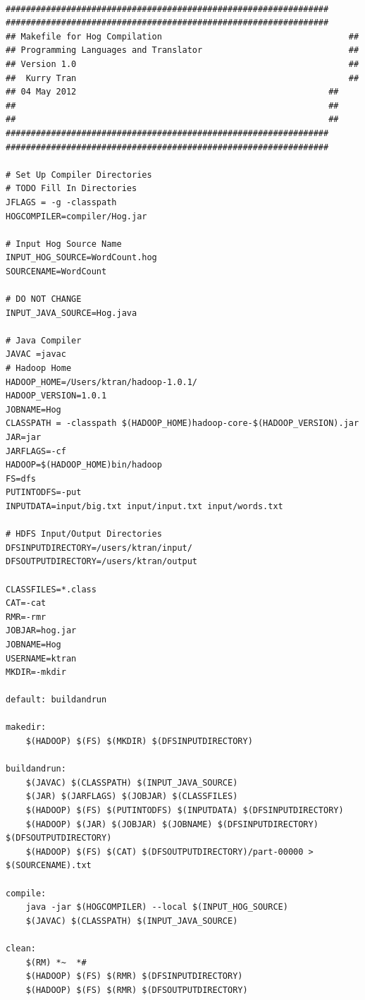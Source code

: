 \documentclass{report}
\begin{document}
\begin{itemize}
\begin{verbatim}

################################################################
################################################################
## Makefile for Hog Compilation										##
## Programming Languages and Translator								##
## Version 1.0														##
##  Kurry Tran														##
## 04 May 2012													##
##																##
##																##
################################################################
################################################################

# Set Up Compiler Directories
# TODO Fill In Directories
JFLAGS = -g -classpath
HOGCOMPILER=compiler/Hog.jar

# Input Hog Source Name
INPUT_HOG_SOURCE=WordCount.hog
SOURCENAME=WordCount

# DO NOT CHANGE
INPUT_JAVA_SOURCE=Hog.java

# Java Compiler
JAVAC =javac
# Hadoop Home
HADOOP_HOME=/Users/ktran/hadoop-1.0.1/
HADOOP_VERSION=1.0.1
JOBNAME=Hog
CLASSPATH = -classpath $(HADOOP_HOME)hadoop-core-$(HADOOP_VERSION).jar
JAR=jar
JARFLAGS=-cf
HADOOP=$(HADOOP_HOME)bin/hadoop
FS=dfs
PUTINTODFS=-put
INPUTDATA=input/big.txt input/input.txt input/words.txt

# HDFS Input/Output Directories
DFSINPUTDIRECTORY=/users/ktran/input/
DFSOUTPUTDIRECTORY=/users/ktran/output

CLASSFILES=*.class
CAT=-cat
RMR=-rmr
JOBJAR=hog.jar
JOBNAME=Hog
USERNAME=ktran
MKDIR=-mkdir

default: buildandrun

makedir:
	$(HADOOP) $(FS) $(MKDIR) $(DFSINPUTDIRECTORY)

buildandrun:
	$(JAVAC) $(CLASSPATH) $(INPUT_JAVA_SOURCE)
	$(JAR) $(JARFLAGS) $(JOBJAR) $(CLASSFILES) 
	$(HADOOP) $(FS) $(PUTINTODFS) $(INPUTDATA) $(DFSINPUTDIRECTORY)
	$(HADOOP) $(JAR) $(JOBJAR) $(JOBNAME) $(DFSINPUTDIRECTORY) $(DFSOUTPUTDIRECTORY)
	$(HADOOP) $(FS) $(CAT) $(DFSOUTPUTDIRECTORY)/part-00000 > $(SOURCENAME).txt

compile:
	java -jar $(HOGCOMPILER) --local $(INPUT_HOG_SOURCE)
	$(JAVAC) $(CLASSPATH) $(INPUT_JAVA_SOURCE)

clean:
	$(RM) *~  *#
	$(HADOOP) $(FS) $(RMR) $(DFSINPUTDIRECTORY)
	$(HADOOP) $(FS) $(RMR) $(DFSOUTPUTDIRECTORY)


\end{verbatim}



\end{itemize}
\end{document}
